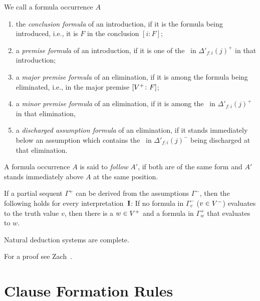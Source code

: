 \documentclass{article}
\begin{document}
\begin{definition}
We call a formula occurrence $A$
\begin{enumerate}
\item the {\em conclusion formula} of an introduction, if it is the formula
      being introduced, i.e., it is $F$ in the conclusion $[i \colon F]$;
\item a {\em premise formula} of an introduction, if it is one of the \formulae\
      in $\Delta'_{f\colon i}(j)^+$ in that introduction;
\item a {\em major premise formula} of an elimination, if it is among the
      formula being eliminated, i.e., in the major premise $[V^+ \colon F]$;
\item a {\em minor premise formula} of an elimination, if it is among
      the \formulae\ in $\Delta'_{f\colon i}(j)^+$ in that elimination,
\item a {\em discharged assumption formula} of an elimination, if
      it stands immediately below an assumption which contains
      the \formulae\ in $\Delta'_{f\colon i}(j)^-$ being discharged
      at that elimination.
\end{enumerate}
A formula occurrence $A$ is said to {\em follow} $A'$, if both
are of the same form and $A'$ stands immediately above $A$
at the same position.
\end{definition}

\begin{theorem}[Soundness]
If a partial sequent $\Gamma^+$ can be derived from the
assumptions $\Gamma^-$, then the following holds for every
interpretation~${\bf I}$:
If no formula in $\Gamma^-_v$ ($v \in V^-$) evaluates
to the truth value $v$, then there is a $w \in V^+$ and a formula
in $\Gamma^+_w$ that evaluates to $w$.
\end{theorem}

\begin{theorem}[Completeness]
Natural deduction systems are complete.
\end{theorem}

For a proof see Zach~\cite{Zach93DA}.



\section{Clause Formation Rules}\label{sec:clauses}


\end{document}
